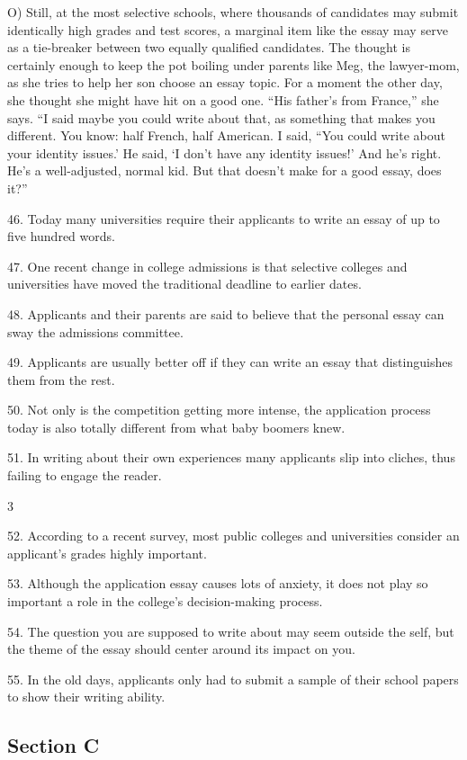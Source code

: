 \documentclass[UTF8,11pt]{ctexart}
\begin{document}
O) Still, at the most selective schools, where thousands of candidates may submit identically high grades and test scores, a marginal item like the essay may serve as a tie-breaker between two equally qualified candidates. The thought is certainly enough to keep the pot boiling under parents like Meg, the lawyer-mom, as she tries to help her son choose an essay topic. For a moment the other day, she thought she might have hit on a good one. “His father’s from France,” she says. “I said maybe you could write about that, as something that makes you different. You know: half French, half American. I said, “You could write about your identity issues.’ He said, ‘I don’t have any identity issues!’ And he’s right. He’s a well-adjusted, normal kid. But that doesn’t make for a good essay, does it?”


46. Today many universities require their applicants to write an essay of up to five hundred words.


47. One recent change in college admissions is that selective colleges and universities have moved the traditional deadline to earlier dates.


48. Applicants and their parents are said to believe that the personal essay can sway the admissions committee.


49. Applicants are usually better off if they can write an essay that distinguishes them from the rest.


50. Not only is the competition getting more intense, the application process today is also totally different from what baby boomers knew.


51. In writing about their own experiences many applicants slip into cliches, thus failing to engage the reader.


3


52. According to a recent survey, most public colleges and universities consider an applicant’s grades highly important.


53. Although the application essay causes lots of anxiety, it does not play so important a role in the college’s decision-making process.


54. The question you are supposed to write about may seem outside the self, but the theme of the essay should center around its impact on you.


55. In the old days, applicants only had to submit a sample of their school papers to show their writing ability.


\subsection*{\textbf{Section C}}
\end{document}
